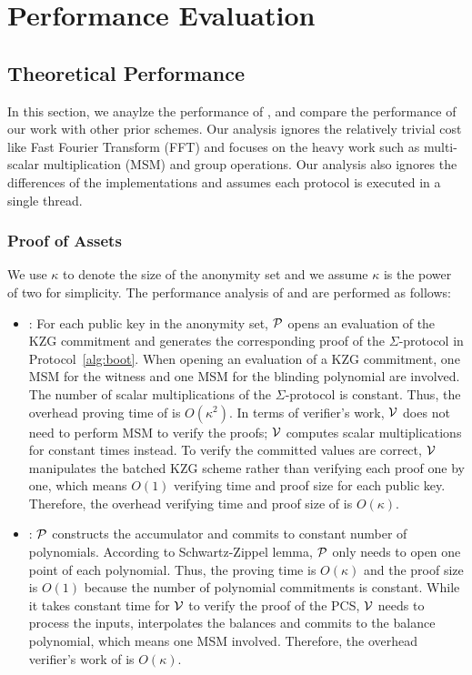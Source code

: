 \chapter{Performance Evaluation}

\section{Theoretical Performance}

In this section, we anaylze the performance of \Sys, and compare the performance of our work with other prior schemes. Our analysis ignores the relatively trivial cost like Fast Fourier Transform (FFT) and focuses on the heavy work such as multi-scalar multiplication (MSM) and group operations. Our analysis also ignores the differences of the implementations and assumes each protocol is executed in a single thread.
\subsection{Proof of Assets}

We use $\kappa$ to denote the size of the anonymity set and we assume $\kappa$ is the power of two for simplicity. The performance analysis of \bootstrap and \userproof are performed as follows:
\begin{itemize}
\item \bootstrap: For each public key in the anonymity set, $\mathcal{P}$ opens an evaluation of the KZG commitment and generates the corresponding proof of the $\Sigma$-protocol in Protocol~\ref{alg:boot}. When opening an evaluation of a KZG commitment, one MSM for the witness and one MSM for the blinding polynomial are involved. The number of scalar multiplications of the $\Sigma$-protocol is constant. Thus, the overhead proving time of \bootstrap is $O(\kappa^2)$. In terms of verifier's work, $\mathcal{V}$ does not need to perform MSM to verify the proofs; $\mathcal{V}$ computes scalar multiplications for constant times instead. To verify the committed values are correct, $\mathcal{V}$ manipulates the batched KZG scheme rather than verifying each proof one by one, which means $O(1)$ verifying time and proof size for each public key. Therefore, the overhead verifying time and proof size of \bootstrap is $O(\kappa)$.
\item \poa: $\mathcal{P}$ constructs the accumulator and commits to constant number of polynomials. According to Schwartz-Zippel lemma, $\mathcal{P}$ only needs to open one point of each polynomial. Thus, the proving time is $O(\kappa)$ and the proof size is $O(1)$ because the number of polynomial commitments is constant. While it takes constant time for $\mathcal{V}$ to verify the proof of the PCS, $\mathcal{V}$ needs to process the inputs, \ie interpolates the balances and commits to the balance polynomial, which means one MSM involved. Therefore, the overhead verifier's work of \poa is $O(\kappa)$.
\end{itemize}

